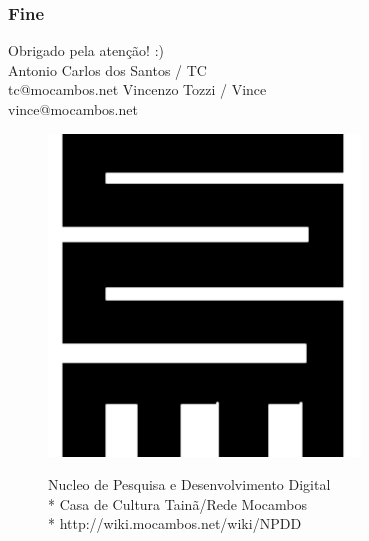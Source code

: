 \documentclass{beamer}
\begin{document}
{ \begin{frame}
  \frametitle{Fine}
  \begin{center}
   \huge Obrigado pela atenção! :) \\
   \vfill
   \large  
   Antonio Carlos dos Santos / TC \\
   \normalsize
   tc@mocambos.net
   \vfill
   \large  
   Vincenzo Tozzi / Vince \\
   \normalsize
   vince@mocambos.net
   \vfill
   \begin{figure}[htb]
     \begin{minipage}[c]{0.10\textwidth}
       \includegraphics[width=\textwidth]{./FIG/NPDD.pdf}
  \end{minipage}
  \begin{minipage}[c]{0.60\textwidth}
    \footnotesize
    Nucleo de Pesquisa e Desenvolvimento Digital \\*
    Casa de Cultura Tainã/Rede Mocambos\\*
    http://wiki.mocambos.net/wiki/NPDD
  \end{minipage}

\end{figure}
\end{center}
\end{frame}

} %
\end{document}
